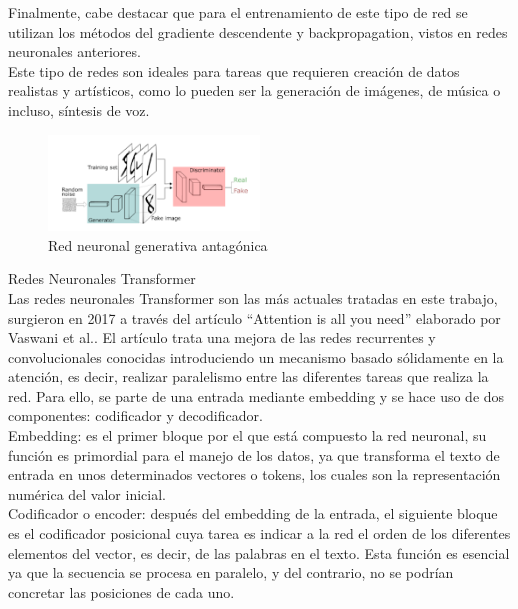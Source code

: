 Finalmente, cabe destacar que para el entrenamiento de este tipo de red se utilizan los métodos del gradiente descendente y backpropagation, vistos en redes neuronales anteriores. \\

Este tipo de redes son ideales para tareas que requieren creación de datos realistas y artísticos, como lo pueden ser la generación de imágenes, de música o incluso, síntesis de voz. 

\begin{figure}[h]
	\centering
	\includegraphics[width = 0.5\textwidth]{Imagenes/Vectorial/gan.png}
	\caption{Red neuronal generativa antagónica}
	\label{fig:sampleImage}
\end{figure}


Redes Neuronales Transformer\\

Las redes neuronales Transformer son las más actuales tratadas en este trabajo, surgieron en 2017 a través del artículo “Attention is all you need” elaborado por Vaswani et al.. El artículo trata una mejora de las redes recurrentes y convolucionales conocidas introduciendo un mecanismo basado sólidamente en la atención, es decir, realizar paralelismo entre las diferentes tareas que realiza la red. Para ello, se parte de una entrada mediante embedding y se hace uso de dos componentes: codificador y decodificador. \\

Embedding: es el primer bloque por el que está compuesto la red neuronal, su función es primordial para el manejo de los datos, ya que transforma el texto de entrada en unos determinados vectores o tokens, los cuales son la representación numérica del valor inicial. \\

Codificador o encoder:  después del embedding de la entrada, el siguiente bloque es el codificador posicional cuya tarea es indicar a la red el orden de los diferentes elementos del vector, es decir, de las palabras en el texto. Esta función es esencial ya que la secuencia se procesa en paralelo, y del contrario, no se podrían concretar las posiciones de cada uno.\\

